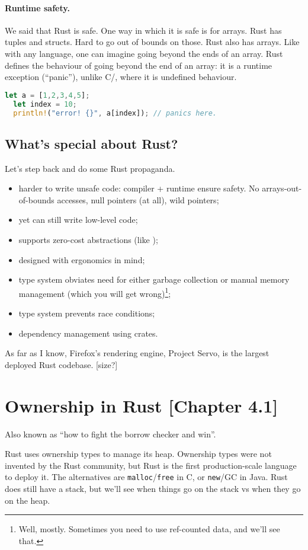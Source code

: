 \paragraph{Runtime safety.} We said that Rust is safe. One way in which it is safe is for
arrays. Rust has tuples and structs. Hard to go out of bounds on those. Rust also has arrays.
Like with any language, one can imagine going beyond the ends of an array. Rust defines
the behaviour of going beyond the end of an array: it is a runtime exception (``panic''),
unlike C/\CPP, where it is undefined behaviour.


\begin{lstlisting}[language=Rust]
  let a = [1,2,3,4,5];
  let index = 10;
  println!("error! {}", a[index]); // panics here.
\end{lstlisting}

\subsection*{What's special about Rust?}
Let's step back and do some Rust propaganda.
\begin{itemize}[noitemsep]
\item harder to write unsafe code: compiler + runtime ensure safety. No arrays-out-of-bounds accesses, null pointers (at all), wild pointers;
\item yet can still write low-level code;
\item supports zero-cost abstractions (like \CPP);
\item designed with ergonomics in mind;
\item type system obviates need for either garbage collection or manual memory management (which you will get wrong)\footnote{Well, mostly. Sometimes you need to use ref-counted data, and we'll see that.};
\item type system prevents race conditions;
\item dependency management using crates.
\end{itemize}
As far as I know, Firefox's rendering engine, Project Servo, is the largest deployed Rust codebase. [size?]


\section*{Ownership in Rust [Chapter 4.1]}
Also known as ``how to fight the borrow checker and win''.

Rust uses ownership types to manage its heap. Ownership types were not invented by the Rust
community, but Rust is the first production-scale language to deploy it. The alternatives
are {\tt malloc}/{\tt free} in C, or {\tt new}/GC in Java. Rust does still have a stack, but
we'll see when things go on the stack vs when they go on the heap.

